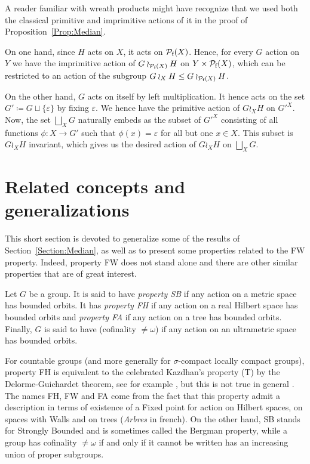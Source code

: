\begin{rem}
A reader familiar with wreath products might have recognize that we used both the classical primitive and imprimitive actions of it in the proof of Proposition~\ref{Prop:Median}.

On one hand, since $H$ acts on $X$, it acts on $\mathcal P_{\textnormal{f}}(X)$.
Hence, for every $G$ action on $Y$ we have the imprimitive action of $G\wr_{\mathcal P_{\textnormal{f}}(X)} H$ on $Y\times \mathcal P_{\textnormal{f}}(X)$, which can be restricted to an action of the subgroup $G\wr_{X} H\leq G\wr_{\mathcal P_{\textnormal{f}}(X)} H$.

On the other hand, $G$ acts on itself by left multiplication.
It hence acts on the set $G'\coloneqq G\sqcup\{\varepsilon\}$ by fixing $\varepsilon$.
We hence have the primitive action of $G\wr_{X} H$ on $G'^X$.
Now, the set $\bigsqcup_XG$ naturally embeds as the subset of $G'^X$ consisting of all functions $\phi\colon X\to G'$ such that $\phi(x)=\varepsilon$ for all but one $x\in X$.
This subset is $G\wr_{X} H$ invariant, which gives us the desired action of $G\wr_{X} H$ on $\bigsqcup_XG$.
\end{rem}




\section{Related concepts and generalizations}\label{Section:Generalizations}
This short section is devoted to generalize some of the results of Section~\ref{Section:Median}, as well as to present some properties related to the FW property. Indeed, property FW does not stand alone and there are other similar properties that are of great interest.
\begin{defn}\label{Def:FHFA}
Let $G$ be a group.
It is said to have \emph{property SB} if any action on a metric space has bounded orbits.
It has \emph{property FH} if any action on a real Hilbert space has bounded orbits and \emph{property FA} if any action on a tree has bounded orbits.
Finally, $G$ is said to have (cofinality $\neq\omega$) if any action on an ultrametric space has bounded orbits.
\end{defn}
For countable groups (and more generally for $\sigma$-compact locally compact groups), property FH is equivalent to the celebrated Kazdhan's property (T) by the Delorme-Guichardet theorem, see for example \cite{MR2415834}, but this is not true in general \cite{MR2240370}.
The names FH, FW and FA come from the fact that this property admit a description in terms of existence of a Fixed point for action on Hilbert spaces, on spaces with Walls and on trees (\emph{Arbres} in french).
On the other hand, SB stands for Strongly Bounded and is sometimes called the Bergman property, while a group has cofinality $\neq\omega$ if and only if it cannot be written has an increasing union of proper subgroups.

